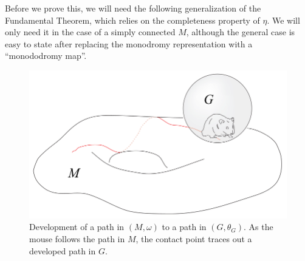 Before we prove this, we will need the following generalization of the Fundamental Theorem, which relies on the completeness property of $\eta$. We will only need it in the case of a simply connected $M$, although the general case is easy to state after replacing the monodromy representation with a ``monododromy map''.

\begin{figure}[tp]
    \centering
    \includegraphics[scale=0.2]{figures/development.png}
    \caption{Development of a path in $(M,\omega)$ to a path in $(G,\theta_G)$. As the mouse follows the path in $M$, the contact point traces out a developed path in $G$.}
    \label{fig:development} 
\end{figure}


